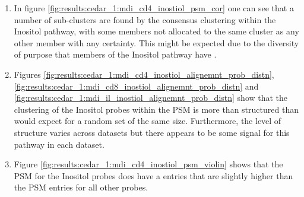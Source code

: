 \documentclass[12pt]{article} %
\begin{document}
	\newpage
	
%
%
		
	\newpage
	
	\begin{enumerate}
		\item In figure \ref{fig:results:cedar_1:mdi_cd4_inostiol_psm_cor} one can see that a number of sub-clusters are found by the consensus clustering within the Inositol pathway, with some members not allocated to the same cluster as any other member with any certainty. This might be expected due to the diversity of purpose that members of the Inositol pathway have \citep{monserrate2010inositol}.
		\item Figures \ref{fig:results:cedar_1:mdi_cd4_inostiol_alignemnt_prob_distn}, \ref{fig:results:cedar_1:mdi_cd8_inostiol_alignemnt_prob_distn} and \ref{fig:results:cedar_1:mdi_il_inostiol_alignemnt_prob_distn} show that the clustering of the Inositol probes within the PSM is more than structured than would expect for a random set of the same size. Furthermore, the level of structure varies across datasets but there appears to be some signal for this pathway in each dataset.
		\item Figure \ref{fig:results:cedar_1:mdi_cd4_inostiol_psm_violin} shows that the PSM for the Inositol probes does have a entries that are slightly higher than the PSM entries for all other probes.
	\end{enumerate}
	
	
\end{document}
